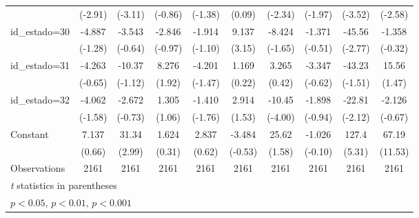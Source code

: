 {\begin{tabular}{l*{9}{c}}
                    &     (-2.91)         &     (-3.11)         &     (-0.86)         &     (-1.38)         &      (0.09)         &     (-2.34)         &     (-1.97)         &     (-3.52)         &     (-2.58)         \\
[1em]
id\_estado=30        &      -4.887         &      -3.543         &      -2.846         &      -1.914         &       9.137\sym{**} &      -8.424         &      -1.371         &      -45.56\sym{**} &      -1.358         \\
                    &     (-1.28)         &     (-0.64)         &     (-0.97)         &     (-1.10)         &      (3.15)         &     (-1.65)         &     (-0.51)         &     (-2.77)         &     (-0.32)         \\
[1em]
id\_estado=31        &      -4.263         &      -10.37         &       8.276         &      -4.201         &       1.169         &       3.265         &      -3.347         &      -43.23         &       15.56         \\
                    &     (-0.65)         &     (-1.12)         &      (1.92)         &     (-1.47)         &      (0.22)         &      (0.42)         &     (-0.62)         &     (-1.51)         &      (1.47)         \\
[1em]
id\_estado=32        &      -4.062         &      -2.672         &       1.305         &      -1.410         &       2.914         &      -10.45\sym{***}&      -1.898         &      -22.81\sym{*}  &      -2.126         \\
                    &     (-1.58)         &     (-0.73)         &      (1.06)         &     (-1.76)         &      (1.53)         &     (-4.00)         &     (-0.94)         &     (-2.12)         &     (-0.67)         \\
[1em]
Constant            &       7.137         &       31.34\sym{**} &       1.624         &       2.837         &      -3.484         &       25.62         &      -1.026         &       127.4\sym{***}&       67.19\sym{***}\\
                    &      (0.66)         &      (2.99)         &      (0.31)         &      (0.62)         &     (-0.53)         &      (1.58)         &     (-0.10)         &      (5.31)         &     (11.53)         \\
\hline
Observations        &        2161         &        2161         &        2161         &        2161         &        2161         &        2161         &        2161         &        2161         &        2161         \\
\hline\hline
\multicolumn{10}{l}{\footnotesize \textit{t} statistics in parentheses}\\
\multicolumn{10}{l}{\footnotesize \sym{*} \(p<0.05\), \sym{**} \(p<0.01\), \sym{***} \(p<0.001\)}\\
\end{tabular}
}
